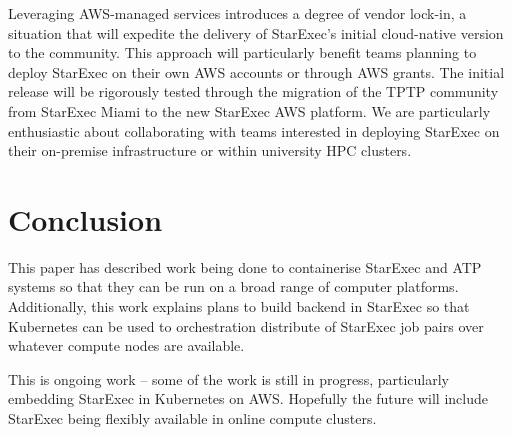 \documentclass{easychair}
\begin{document}
Leveraging AWS-managed services introduces a degree of vendor lock-in, a situation that
will expedite the delivery of StarExec's initial cloud-native version to the community. 
This approach will particularly benefit teams planning to deploy StarExec on their own AWS 
accounts or through AWS grants.
The initial release will be rigorously tested through the migration of the TPTP community from 
StarExec Miami to the new StarExec AWS platform. 
We are particularly enthusiastic about collaborating with teams interested in deploying StarExec 
on their on-premise infrastructure or within university HPC clusters.

\section{Conclusion}
\label{Conclusion}

This paper has described work being done to containerise StarExec and ATP systems so that they 
can be run on a broad range of computer platforms.
Additionally, this work explains plans to build backend in StarExec so that Kubernetes can be 
used to orchestration distribute of StarExec job pairs over whatever compute nodes are available.

This is ongoing work -- some of the work is still in progress, particularly embedding StarExec in 
Kubernetes on AWS.
Hopefully the future will include StarExec being flexibly available in online compute clusters.



\appendix

\newpage
\end{document}
